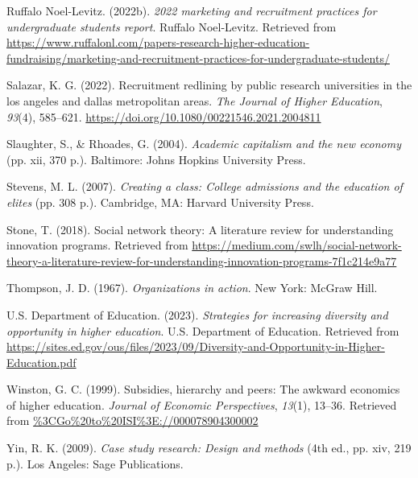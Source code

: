 \documentclass[
  12pt,
]{article}
\newlength{\cslhangindent}
\newlength{\cslentryspacingunit} %
\newenvironment{CSLReferences}[2] %
 {%
  \setlength{\parindent}{0pt}
  \ifodd #1
  \let\oldpar\par
  \def\par{\hangindent=\cslhangindent\oldpar}
  \fi
  \setlength{\parskip}{#2\cslentryspacingunit}
 }%
 {}
\begin{document}
\begin{CSLReferences}{1}{0}
\leavevmode{}%
Ruffalo Noel-Levitz. (2022b). \emph{2022 marketing and recruitment practices for undergraduate students report}. Ruffalo Noel-Levitz. Retrieved from \url{https://www.ruffalonl.com/papers-research-higher-education-fundraising/marketing-and-recruitment-practices-for-undergraduate-students/}

\leavevmode{}%
Salazar, K. G. (2022). Recruitment redlining by public research universities in the los angeles and dallas metropolitan areas. \emph{The Journal of Higher Education}, \emph{93}(4), 585--621. \url{https://doi.org/10.1080/00221546.2021.2004811}

\leavevmode{}%
Slaughter, S., \& Rhoades, G. (2004). \emph{Academic capitalism and the new economy} (pp. xii, 370 p.). Baltimore: Johns Hopkins University Press.

\leavevmode{}%
Stevens, M. L. (2007). \emph{Creating a class: College admissions and the education of elites} (pp. 308 p.). Cambridge, MA: Harvard University Press.

\leavevmode{}%
Stone, T. (2018). Social network theory: A literature review for understanding innovation programs. Retrieved from \url{https://medium.com/swlh/social-network-theory-a-literature-review-for-understanding-innovation-programs-7f1c214e9a77}

\leavevmode{}%
Thompson, J. D. (1967). \emph{Organizations in action}. New York: McGraw Hill.

\leavevmode{}%
U.S. Department of Education. (2023). \emph{Strategies for increasing diversity and opportunity in higher education}. U.S. Department of Education. Retrieved from \url{https://sites.ed.gov/ous/files/2023/09/Diversity-and-Opportunity-in-Higher-Education.pdf}

\leavevmode{}%
Winston, G. C. (1999). Subsidies, hierarchy and peers: The awkward economics of higher education. \emph{Journal of Economic Perspectives}, \emph{13}(1), 13--36. Retrieved from \url{\%3CGo\%20to\%20ISI\%3E://000078904300002}

\leavevmode{}%
Yin, R. K. (2009). \emph{Case study research: Design and methods} (4th ed., pp. xiv, 219 p.). Los Angeles: Sage Publications.


\end{CSLReferences}
\end{document}
